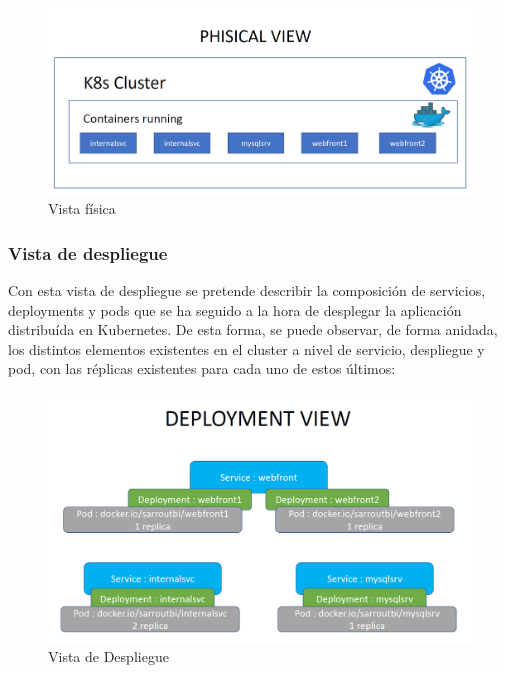 \documentclass[12pt,spanish]{article}
\begin{document}
\begin{center}
 \begin{figure}[H]
 \begin{center}
   \includegraphics[width=18cm]{img/physicalView00.png}
   \caption{Vista física}
   \label{fig:physicalView00}
 \end{center}
 \end{figure}
\end{center}

\subsubsection{Vista de despliegue}

Con esta vista de despliegue se pretende describir la composición de servicios, deployments y pods que se ha seguido a la hora de desplegar la aplicación distribuída en Kubernetes. De esta forma, se puede observar, de forma anidada, los distintos elementos existentes en el cluster a nivel de servicio, despliegue y pod, con las réplicas existentes para cada uno de estos últimos:

\begin{center}
 \begin{figure}[H]
 \begin{center}
   \includegraphics[width=18cm]{img/deploymentView00.png}
   \caption{Vista de Despliegue}
   \label{fig:deploymentView00}
 \end{center}
 \end{figure}
\end{center}
\end{document}
